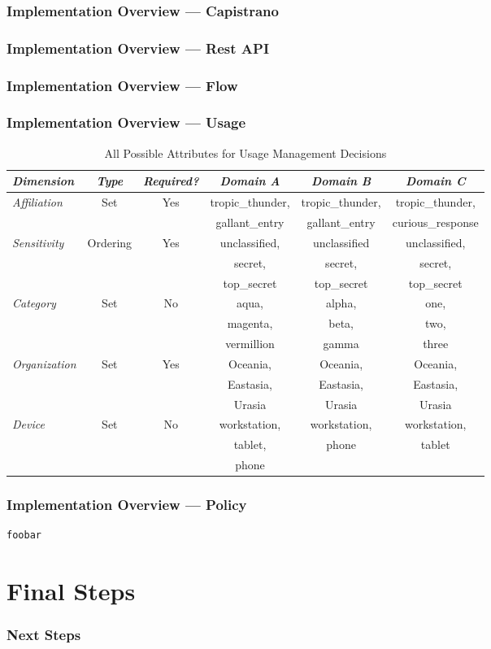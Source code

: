 \documentclass[t,handout, 10pt]{beamer}
\begin{document}
\begin{frame}
\frametitle{Implementation Overview --- Capistrano}
\end{frame}

\begin{frame}
\frametitle{Implementation Overview --- Rest API}
\end{frame}

\begin{frame}
\frametitle{Implementation Overview --- Flow}
\end{frame}

\begin{frame}
\frametitle{Implementation Overview --- Usage}
{\tiny
\begin{table}[tp] %
\centering %
\begin{tabular}{lccccc}
\toprule %
\emph{Dimension}		& \emph{Type}	& \emph{Required?}	& \emph{Domain A}	& \emph{Domain B}	& \emph{Domain C} 	\\\toprule
\emph{Affiliation} 	& Set 			& Yes 				& tropic\_thunder, 	& tropic\_thunder,	& tropic\_thunder, 	\\
					&				&					& gallant\_entry	& gallant\_entry	& curious\_response	\\\midrule
\emph{Sensitivity} 	& Ordering 		& Yes 				& unclassified,		& unclassified		& unclassified,		\\
					&				&					& secret,			& secret,			& secret,			\\
					&				&					& top\_secret		& top\_secret		& top\_secret		\\\midrule
\emph{Category}		& Set 			& No 				& aqua,				& alpha,			& one,				\\
					&				&					& magenta,			& beta,				& two,				\\
					&				&					& vermillion		& gamma				& three				\\\midrule
\emph{Organization}	& Set 			& Yes 				& Oceania, 			& Oceania,			& Oceania,			\\
					&				&					& Eastasia,			& Eastasia,			& Eastasia,			\\
					&				&					& Urasia			& Urasia			& Urasia				\\\midrule
\emph{Device}	 	& Set 			& No 				& workstation, 		& workstation,		& workstation, 		\\
					&				&					& tablet,			& phone				& tablet			\\
					&				&					& phone				& 					& 					\\\midrule
\end{tabular}
\caption{All Possible Attributes for Usage Management Decisions}
\label{table:model:network-attributes}
\end{table}
}
\end{frame}

\begin{frame}
\frametitle{Implementation Overview --- Policy}
\begin{lstlisting}[language=ruby, label=lst:policy-dsl, caption=Policy DSL Example]
foobar
\end{lstlisting}
\end{frame}

\section{Final Steps}
\begin{frame}
\frametitle{Next Steps}
\end{frame}
\end{document}
